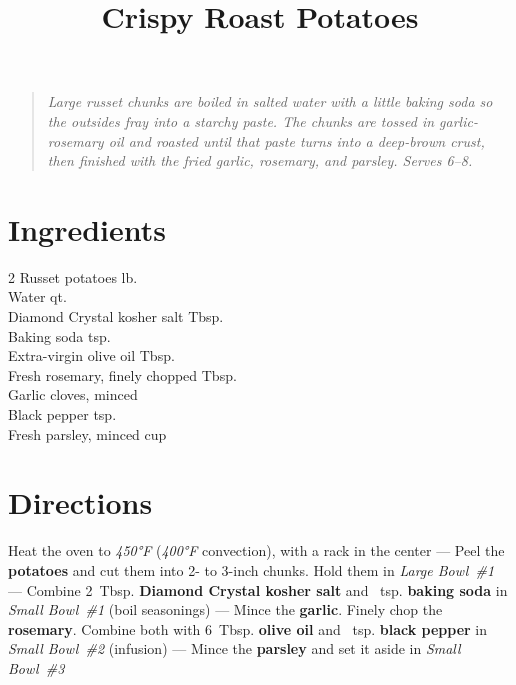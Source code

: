 \documentclass[11pt,letterpaper]{article}
\title{Crispy Roast Potatoes}
\author{}
\date{}
\begin{document}
\maketitle
\thispagestyle{empty}

\begin{quote}
\textit{Large russet chunks are boiled in salted water with a little baking soda so the outsides fray into a starchy paste. The chunks are tossed in garlic-rosemary oil and roasted until that paste turns into a deep-brown crust, then finished with the fried garlic, rosemary, and parsley. Serves 6--8.}
\end{quote}

\section*{Ingredients}
\setlength{\columnsep}{20pt}
\begin{multicols}{2}
\noindent
    Russet potatoes  lb. \\
    Water  qt. \\
    Diamond Crystal kosher salt  Tbsp. \\
    Baking soda \dotfill {} tsp. \\
    \columnbreak
    Extra-virgin olive oil  Tbsp. \\
    Fresh rosemary, finely chopped  Tbsp. \\
    Garlic cloves, minced  \\
    Black pepper \dotfill {} tsp. \\
    Fresh parsley, minced \dotfill {} cup \\
\end{multicols}

\section*{Directions}

\noindent
Heat the oven to \textit{450°F} (\textit{400°F} convection), with a rack in the center ---
Peel the \textbf{potatoes} and cut them into 2- to 3-inch chunks. Hold them in \textit{Large Bowl~\#1} ---
Combine 2~Tbsp. \textbf{Diamond Crystal kosher salt} and ~tsp. \textbf{baking soda} in \textit{Small Bowl~\#1} (boil seasonings) ---
Mince the \textbf{garlic}. Finely chop the \textbf{rosemary}. Combine both with 6~Tbsp. \textbf{olive oil} and ~tsp. \textbf{black pepper} in \textit{Small Bowl~\#2} (infusion) ---
Mince the \textbf{parsley} and set it aside in \textit{Small Bowl~\#3}
\end{document}
